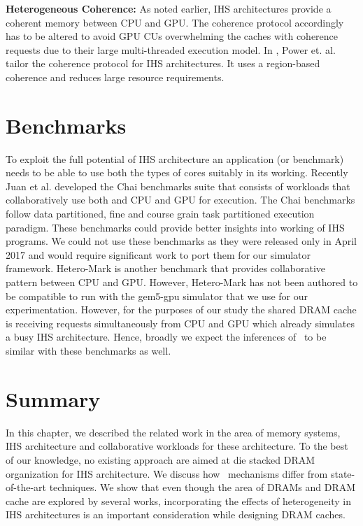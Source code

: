 \par \textbf{Heterogeneous Coherence:} As noted earlier, IHS architectures provide a coherent memory between CPU and GPU. The coherence protocol accordingly has to be altered to avoid GPU CUs overwhelming the caches with coherence requests due to their large multi-threaded execution model. In \cite{hsc-coherence}, Power et. al. tailor the coherence protocol for IHS architectures. It uses a region-based coherence and reduces large resource requirements.

\section{Benchmarks} \label{related-work-benchmarks}
To exploit the full potential of IHS architecture an application (or benchmark) needs to be able to use both the types of cores suitably in its working. Recently Juan et al. developed the Chai benchmarks suite \cite{chai} that consists of workloads that collaboratively use both and CPU and GPU for execution. The Chai benchmarks follow data partitioned, fine and course grain task partitioned execution paradigm. These benchmarks could provide better insights into working of IHS programs. We could not use these benchmarks as they were released only in April 2017 and would require significant work to port them for our simulator framework. Hetero-Mark \cite{hetero-mark} is another benchmark that provides collaborative pattern between CPU and GPU. However, Hetero-Mark has not been authored to be compatible to run with the gem5-gpu simulator that we use for our experimentation. However, for the purposes of our study the shared DRAM cache is receiving requests simultaneously from CPU and GPU which already simulates a busy IHS architecture.  Hence, broadly we expect the inferences of \cachename\ to be similar with these benchmarks as well.

\section{Summary}
In this chapter, we described the related work in the area of memory systems, IHS architecture and collaborative workloads for these architecture. To the best of our knowledge, no existing approach are aimed at die stacked DRAM organization for IHS architecture. We discuss how \cachename\ mechanisms differ from state-of-the-art techniques. We show that even though the area of DRAMs and DRAM cache are explored by several works, incorporating the effects of heterogeneity in IHS architectures is an important consideration while designing DRAM caches.